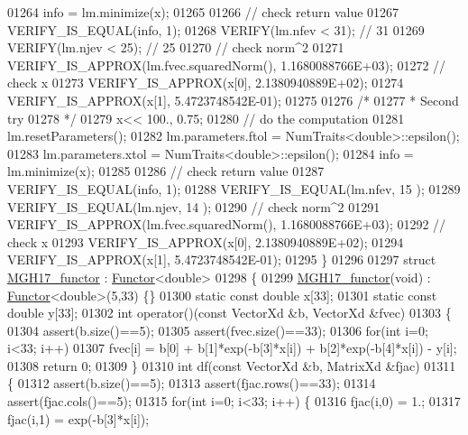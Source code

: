 \begin{DoxyCode}
01264   info = lm.minimize(x);
01265 
01266   \textcolor{comment}{// check return value}
01267   VERIFY\_IS\_EQUAL(info, 1);
01268   VERIFY(lm.nfev < 31); \textcolor{comment}{// 31}
01269   VERIFY(lm.njev < 25); \textcolor{comment}{// 25}
01270   \textcolor{comment}{// check norm^2}
01271   VERIFY\_IS\_APPROX(lm.fvec.squaredNorm(), 1.1680088766E+03);
01272   \textcolor{comment}{// check x}
01273   VERIFY\_IS\_APPROX(x[0], 2.1380940889E+02);
01274   VERIFY\_IS\_APPROX(x[1], 5.4723748542E-01);
01275 
01276   \textcolor{comment}{/*}
01277 \textcolor{comment}{   * Second try}
01278 \textcolor{comment}{   */}
01279   x<< 100., 0.75;
01280   \textcolor{comment}{// do the computation}
01281   lm.resetParameters();
01282   lm.parameters.ftol = NumTraits<double>::epsilon();
01283   lm.parameters.xtol = NumTraits<double>::epsilon();
01284   info = lm.minimize(x);
01285 
01286   \textcolor{comment}{// check return value}
01287   VERIFY\_IS\_EQUAL(info, 1); 
01288   VERIFY\_IS\_EQUAL(lm.nfev, 15 ); 
01289   VERIFY\_IS\_EQUAL(lm.njev, 14 ); 
01290   \textcolor{comment}{// check norm^2}
01291   VERIFY\_IS\_APPROX(lm.fvec.squaredNorm(), 1.1680088766E+03);
01292   \textcolor{comment}{// check x}
01293   VERIFY\_IS\_APPROX(x[0], 2.1380940889E+02);
01294   VERIFY\_IS\_APPROX(x[1], 5.4723748542E-01);
01295 \}
01296 
01297 \textcolor{keyword}{struct }\hyperlink{struct_m_g_h17__functor}{MGH17\_functor} : \hyperlink{struct_functor}{Functor}<double>
01298 \{
01299     \hyperlink{struct_m_g_h17__functor}{MGH17\_functor}(\textcolor{keywordtype}{void}) : \hyperlink{struct_functor}{Functor}<double>(5,33) \{\}
01300     \textcolor{keyword}{static} \textcolor{keyword}{const} \textcolor{keywordtype}{double} x[33];
01301     \textcolor{keyword}{static} \textcolor{keyword}{const} \textcolor{keywordtype}{double} y[33];
01302     \textcolor{keywordtype}{int} operator()(\textcolor{keyword}{const} VectorXd &b, VectorXd &fvec)
01303     \{
01304         assert(b.size()==5);
01305         assert(fvec.size()==33);
01306         \textcolor{keywordflow}{for}(\textcolor{keywordtype}{int} i=0; i<33; i++)
01307             fvec[i] =  b[0] + b[1]*exp(-b[3]*x[i]) +  b[2]*exp(-b[4]*x[i]) - y[i];
01308         \textcolor{keywordflow}{return} 0;
01309     \}
01310     \textcolor{keywordtype}{int} df(\textcolor{keyword}{const} VectorXd &b, MatrixXd &fjac)
01311     \{
01312         assert(b.size()==5);
01313         assert(fjac.rows()==33);
01314         assert(fjac.cols()==5);
01315         \textcolor{keywordflow}{for}(\textcolor{keywordtype}{int} i=0; i<33; i++) \{
01316             fjac(i,0) = 1.;
01317             fjac(i,1) = exp(-b[3]*x[i]);

\end{DoxyCode}
